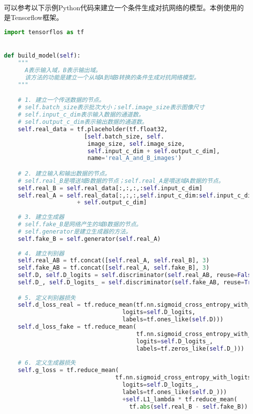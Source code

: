 可以参考以下示例Python代码来建立一个条件生成对抗网络的模型。本例使用的是Tensorflow框架。
\begin{lstlisting}[language=python]
import tensorflos as tf


def build_model(self):
    """
      A表示输入域，B表示输出域。
      该方法的功能是建立一个从域A到域B转换的条件生成对抗网络模型。
    """

    # 1. 建立一个传送数据的节点。
    # self.batch_size表示批次大小；self.image_size表示图像尺寸
    # self.input_c_dim表示输入数据的通道数。
    # self.output_c_dim表示输出数据的通道数。
    self.real_data = tf.placeholder(tf.float32,
                       [self.batch_size, self.    
                        image_size, self.image_size,
                        self.input_c_dim + self.output_c_dim],
                        name='real_A_and_B_images')

    # 2. 建立输入和输出数据的节点。
    # self.real_B是喂送域B数据的节点；self.real_A是喂送域A数据的节点。
    self.real_B = self.real_data[:,:,:,:self.input_c_dim]
    self.real_A = self.real_data[:,:,:,self.input_c_dim:self.input_c_dim 
                     + self.output_c_dim]
    
    # 3. 建立生成器
    # self.fake_B是网络产生的域B数据的节点。
    # self.generator是建立生成器的方法。
    self.fake_B = self.generator(self.real_A)
    
    # 4. 建立判别器
    self.real_AB = tf.concat([self.real_A, self.real_B], 3)
    self.fake_AB = tf.concat([self.real_A, self.fake_B], 3)
    self.D, self.D_logits = self.discriminator(self.real_AB, reuse=False)
    self.D_, self.D_logits_ = self.discriminator(self.fake_AB, reuse=True)

    # 5. 定义判别器损失
    self.d_loss_real = tf.reduce_mean(tf.nn.sigmoid_cross_entropy_with_logits(
                                  logits=self.D_logits, 
                                  labels=tf.ones_like(self.D)))
    self.d_loss_fake = tf.reduce_mean(
                                      tf.nn.sigmoid_cross_entropy_with_logits(
                                      logits=self.D_logits_,
                                      labels=tf.zeros_like(self.D_)))
    
    # 6. 定义生成器损失
    self.g_loss = tf.reduce_mean(
                                tf.nn.sigmoid_cross_entropy_with_logits(
                                  logits=self.D_logits_,
                                  labels=tf.ones_like(self.D_)))
                                  +self.L1_lambda * tf.reduce_mean(
                                    tf.abs(self.real_B - self.fake_B))

\end{lstlisting}




